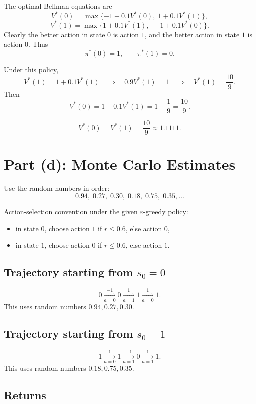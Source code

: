 \documentclass[11pt]{article}
\begin{document}
The optimal Bellman equations are
\[
    V^*(0)=\max\{-1+0.1V^*(0),\;1+0.1V^*(1)\},
\]
\[
    V^*(1)=\max\{1+0.1V^*(1),\;-1+0.1V^*(0)\}.
\]
Clearly the better action in state \(0\) is action \(1\), and the better action in
state \(1\) is action \(0\). Thus
\[
    \boxed{\pi^*(0)=1,\qquad \pi^*(1)=0}.
\]

Under this policy,
\[
    V^*(1)=1+0.1V^*(1)
    \quad\Rightarrow\quad
    0.9V^*(1)=1
    \quad\Rightarrow\quad
    V^*(1)=\frac{10}{9}.
\]
Then
\[
    V^*(0)=1+0.1V^*(1)=1+\frac{1}{9}=\frac{10}{9}.
\]

\[
    \boxed{
    V^*(0)=V^*(1)=\frac{10}{9}\approx 1.1111
    }.
\]

\section*{Part (d): Monte Carlo Estimates}

Use the random numbers in order:
\[
0.94,\;0.27,\;0.30,\;0.18,\;0.75,\;0.35,\ldots
\]

Action-selection convention under the given \(\varepsilon\)-greedy policy:
\begin{itemize}
    \item in state \(0\), choose action \(1\) if \(r\le 0.6\), else action \(0\),
    \item in state \(1\), choose action \(0\) if \(r\le 0.6\), else action \(1\).
\end{itemize}

\subsection*{Trajectory starting from \(s_0=0\)}

\[
    0 \xrightarrow[a=0]{-1} 0 \xrightarrow[a=1]{1} 1 \xrightarrow[a=0]{1} 1.
\]
This uses random numbers \(0.94, 0.27, 0.30\).

\subsection*{Trajectory starting from \(s_0=1\)}

\[
    1 \xrightarrow[a=0]{1} 1 \xrightarrow[a=1]{-1} 0 \xrightarrow[a=1]{1} 1.
\]
This uses random numbers \(0.18, 0.75, 0.35\).

\subsection*{Returns}
\end{document}
